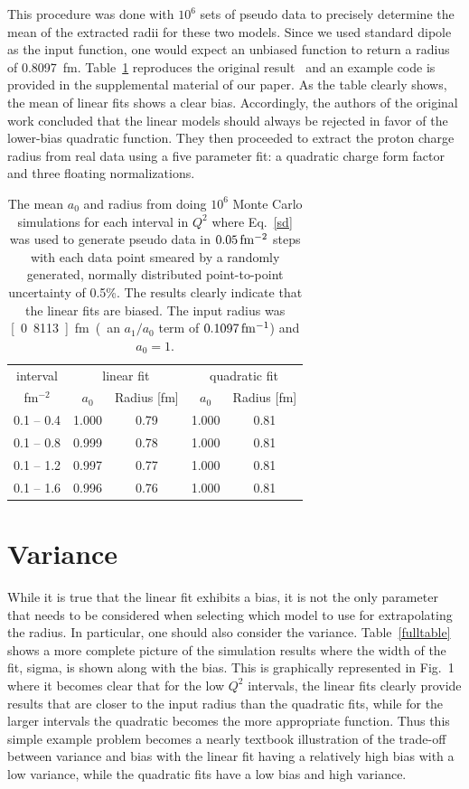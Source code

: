 \documentclass[10pt,aps,prc,twocolumn]{revtex4-1}
\begin{document}
This procedure was done with $10^6$ sets of pseudo data to 
precisely determine the mean of the extracted 
radii for these two models.   Since we used standard dipole as the input function, one would expect an unbiased 
function to return a radius of 0.8097~fm.
Table~\ref{ztable} reproduces the original result~\cite{Borkowski:1975} and
an example code is provided in the supplemental material of our paper.  
As the table clearly shows, the mean of linear fits shows a clear bias. 
Accordingly, the authors of the original work concluded that the linear models 
should always be rejected in favor of the lower-bias quadratic function.
They then proceeded to extract the proton charge radius from real data using a five parameter 
fit: a quadratic charge form factor and three floating normalizations.

\begin{table}
\caption{The mean $a_0$ and radius from doing $10^6$ Monte Carlo simulations
for each interval in $Q^2$
where Eq.~\ref{sd} was used to generate pseudo data in $\unit[0.05]{fm^{-2}}$ steps
with each data point smeared by a randomly generated, normally distributed point-to-point 
uncertainty of 0.5\%.
The results clearly indicate that the linear fits are biased.   The input
radius was \unit[0.8113]{fm} (an $a_1/a_0$ term of $\unit[0.1097]{fm^{-1}}$) and $a_0 = 1$.}
\begin{tabular}{c|cc|cc} \hline
interval       & \multicolumn{2}{c|}{linear fit} & \multicolumn{2}{c}{quadratic fit}  \\
fm$^{-2}$      & $a_0$      & Radius [fm]          & $a_0$    & Radius [fm] \\ \hline
 0.1 -- 0.4 & 1.000& 0.79& 1.000& 0.81 \\
 0.1 -- 0.8 & 0.999& 0.78& 1.000& 0.81 \\
 0.1 -- 1.2 & 0.997& 0.77& 1.000& 0.81 \\
 0.1 -- 1.6 & 0.996& 0.76& 1.000& 0.81 \\ \hline
\end{tabular}
\label{ztable}
\end{table}


\section{Variance}

While it is true that the linear fit exhibits a bias, it is not the only parameter that needs
to be considered when selecting which model to use for extrapolating the radius.
In particular, one should also consider the variance.
Table~\ref{fulltable} shows a more complete picture of the simulation results 
where the width of the fit, sigma, is 
shown along with the bias.   This is graphically represented in Fig.~1 where it becomes clear that 
for the low $Q^2$ intervals, the linear fits clearly provide results that are closer to
the input radius than the quadratic fits, while for the larger intervals the quadratic becomes
the more appropriate function.
Thus this simple example problem becomes a nearly textbook illustration of the trade-off between 
variance and bias with the linear fit having a relatively high bias with a low variance, while the 
quadratic fits have a low bias and high variance.
\end{document}
